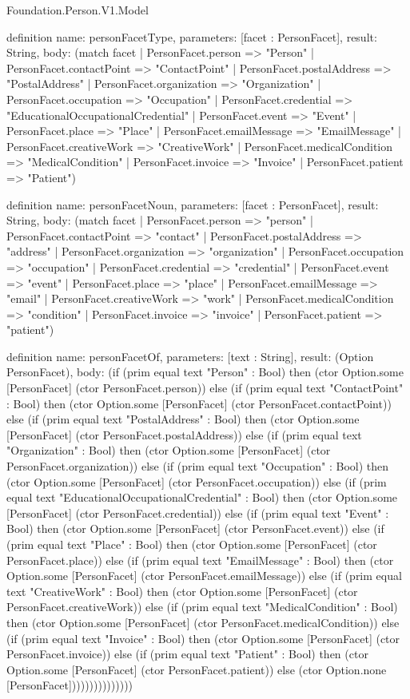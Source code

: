 \begin{lexlean}{Foundation.Person.V1.Model}
\begin{semanticmodule}
definition{
  name: personFacetType,
  parameters: [facet : PersonFacet],
  result: String,
  body: (match facet
    | PersonFacet.person => "Person"
    | PersonFacet.contactPoint => "ContactPoint"
    | PersonFacet.postalAddress => "PostalAddress"
    | PersonFacet.organization => "Organization"
    | PersonFacet.occupation => "Occupation"
    | PersonFacet.credential => "EducationalOccupationalCredential"
    | PersonFacet.event => "Event"
    | PersonFacet.place => "Place"
    | PersonFacet.emailMessage => "EmailMessage"
    | PersonFacet.creativeWork => "CreativeWork"
    | PersonFacet.medicalCondition => "MedicalCondition"
    | PersonFacet.invoice => "Invoice"
    | PersonFacet.patient => "Patient")
}

definition{
  name: personFacetNoun,
  parameters: [facet : PersonFacet],
  result: String,
  body: (match facet
    | PersonFacet.person => "person"
    | PersonFacet.contactPoint => "contact"
    | PersonFacet.postalAddress => "address"
    | PersonFacet.organization => "organization"
    | PersonFacet.occupation => "occupation"
    | PersonFacet.credential => "credential"
    | PersonFacet.event => "event"
    | PersonFacet.place => "place"
    | PersonFacet.emailMessage => "email"
    | PersonFacet.creativeWork => "work"
    | PersonFacet.medicalCondition => "condition"
    | PersonFacet.invoice => "invoice"
    | PersonFacet.patient => "patient")
}

definition{
  name: personFacetOf,
  parameters: [text : String],
  result: (Option PersonFacet),
  body: (if (prim equal text "Person" : Bool) then (ctor Option.some [PersonFacet] (ctor PersonFacet.person)) else (if (prim equal text "ContactPoint" : Bool) then (ctor Option.some [PersonFacet] (ctor PersonFacet.contactPoint)) else (if (prim equal text "PostalAddress" : Bool) then (ctor Option.some [PersonFacet] (ctor PersonFacet.postalAddress)) else (if (prim equal text "Organization" : Bool) then (ctor Option.some [PersonFacet] (ctor PersonFacet.organization)) else (if (prim equal text "Occupation" : Bool) then (ctor Option.some [PersonFacet] (ctor PersonFacet.occupation)) else (if (prim equal text "EducationalOccupationalCredential" : Bool) then (ctor Option.some [PersonFacet] (ctor PersonFacet.credential)) else (if (prim equal text "Event" : Bool) then (ctor Option.some [PersonFacet] (ctor PersonFacet.event)) else (if (prim equal text "Place" : Bool) then (ctor Option.some [PersonFacet] (ctor PersonFacet.place)) else (if (prim equal text "EmailMessage" : Bool) then (ctor Option.some [PersonFacet] (ctor PersonFacet.emailMessage)) else (if (prim equal text "CreativeWork" : Bool) then (ctor Option.some [PersonFacet] (ctor PersonFacet.creativeWork)) else (if (prim equal text "MedicalCondition" : Bool) then (ctor Option.some [PersonFacet] (ctor PersonFacet.medicalCondition)) else (if (prim equal text "Invoice" : Bool) then (ctor Option.some [PersonFacet] (ctor PersonFacet.invoice)) else (if (prim equal text "Patient" : Bool) then (ctor Option.some [PersonFacet] (ctor PersonFacet.patient)) else (ctor Option.none [PersonFacet]))))))))))))))
}


\end{semanticmodule}
\end{lexlean}
